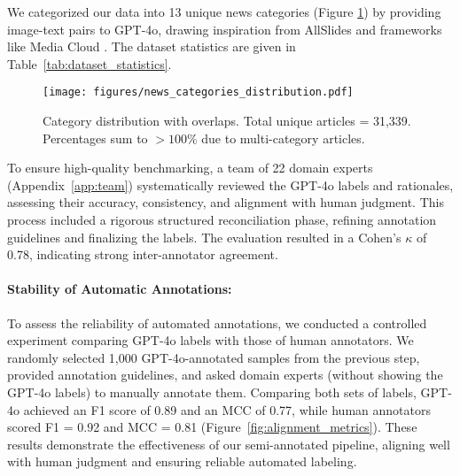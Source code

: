 We categorized our data into 13 unique news categories (Figure \ref{fig:news_categories}) by providing image-text pairs to GPT-4o, drawing inspiration from AllSlides \cite{allsides_mediabiaschart}  and frameworks like Media Cloud \cite{media_cloud}. The dataset statistics are given in Table~\ref{tab:dataset_statistics}.

\begin{figure}[ht]
    \centering
    \texttt{[image: figures/news\_categories\_distribution.pdf]}
    \caption{Category distribution with overlaps. Total unique articles = 31,339. Percentages sum to \(>100\%\) due to multi-category articles.}
    \label{fig:news_categories}
    \vspace{-1em}
\end{figure}

To ensure high-quality benchmarking, a team of 22 domain experts (Appendix~\ref{app:team}) systematically reviewed the GPT-4o labels and rationales, assessing their accuracy, consistency, and alignment with human judgment. This process included a rigorous structured reconciliation phase, refining annotation guidelines and finalizing the labels. The evaluation resulted in a Cohen’s $\kappa$ of 0.78, indicating strong inter-annotator agreement.


\paragraph{Stability of Automatic Annotations:} To assess the reliability of automated annotations, we conducted a controlled experiment comparing GPT-4o labels with those of human annotators. We randomly selected 1,000 GPT-4o-annotated samples from the previous step, provided annotation guidelines, and asked domain experts (without showing the GPT-4o labels) to manually annotate them. Comparing both sets of labels, GPT-4o achieved an F1 score of 0.89 and an MCC of 0.77, while human annotators scored F1 = 0.92 and MCC = 0.81 (Figure~\ref{fig:alignment_metrics}). These results demonstrate the effectiveness of our semi-annotated pipeline, aligning well with human judgment and ensuring reliable automated labeling.



